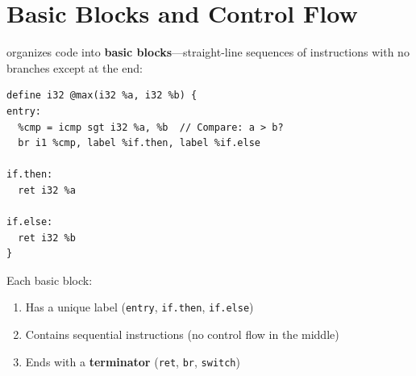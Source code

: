 \section{Basic Blocks and Control Flow}

 organizes code into \textbf{basic blocks}—straight-line sequences of instructions with no branches except at the end:

\begin{lstlisting}[style=ir]
define i32 @max(i32 %a, i32 %b) {
entry:
  %cmp = icmp sgt i32 %a, %b  // Compare: a > b?
  br i1 %cmp, label %if.then, label %if.else

if.then:
  ret i32 %a

if.else:
  ret i32 %b
}
\end{lstlisting}

Each basic block:
\begin{enumerate}[noitemsep]
  \item Has a unique label (\texttt{entry}, \texttt{if.then}, \texttt{if.else})
  \item Contains sequential instructions (no control flow in the middle)
  \item Ends with a \textbf{terminator} (\texttt{ret}, \texttt{br}, \texttt{switch})
\end{enumerate}

